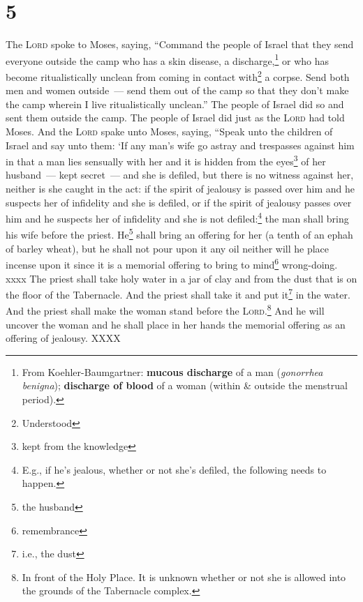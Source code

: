 \section{5}
\begin{enumerate}[align=center]
     The \textsc{Lord} spoke to Moses, saying,%
     ``Command the people of Israel that they send everyone outside the camp who has a skin disease, a discharge,\footnote{From Koehler-Baumgartner: \textbf{mucous discharge} of a man (\textit{gonorrhea benigna}); \textbf{discharge of blood} of a woman (within \& outside the menstrual period).} or who has become ritualistically unclean from coming in contact with\footnote{Understood} a corpse.%
     Send both men and women outside~--- send them out of the camp so that they don't make the camp wherein I live ritualistically unclean.''%
     The people of Israel did so and sent them outside the camp. The people of Israel did just as the \textsc{Lord} had told Moses.%
     And the \textsc{Lord} spake unto Moses, saying,%
     ``Speak unto the children of Israel and say unto them: `If any man's wife go astray and trespasses against him%
     in that a man lies sensually with her and it is hidden from the eyes\footnote{kept from the knowledge} of her husband~--- kept secret~--- and she is defiled, but there is no witness against her, neither is she caught in the act:%
     if the spirit of jealousy is passed over him and he suspects her of infidelity and she is defiled, or if the spirit of jealousy passes over him and he suspects her of infidelity and she is not defiled:\footnote{E.g., if he's jealous, whether or not she's defiled, the following needs to happen.}%
     the man shall bring his wife before the priest. He\footnote{the husband} shall bring an offering for her (a tenth of an ephah of barley wheat), but he shall not pour upon it any oil neither will he place incense upon it since it is a memorial offering to bring to mind\footnote{remembrance} wrong-doing.%
     xxxx%
     The priest shall take holy water in a jar of clay and from the dust that is on the floor of the Tabernacle. And the priest shall take it and put it\footnote{i.e., the dust} in the water.%
     And the priest shall make the woman stand before the \textsc{Lord}.\footnote{In front of the Holy Place. It is unknown whether or not she is allowed into the grounds of the Tabernacle complex.} And he will uncover the woman and he shall place in her hands the memorial offering as an offering of jealousy. XXXX%

\end{enumerate}
